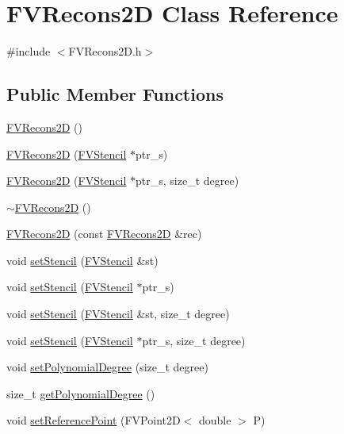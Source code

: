 \hypertarget{classFVRecons2D}{
\section{FVRecons2D Class Reference}
\label{d3/dde/classFVRecons2D}
}


{\ttfamily \#include $<$FVRecons2D.h$>$}

\subsection*{Public Member Functions}
\begin{DoxyCompactItemize}
\item 
\hyperlink{classFVRecons2D_a8dcae930edb192e8d7746e6031eb0867}{FVRecons2D} ()
\item 
\hyperlink{classFVRecons2D_ae47016c5a6bf585400dc3c8bb3cac92f}{FVRecons2D} (\hyperlink{classFVStencil}{FVStencil} $\ast$ptr\_\-s)
\item 
\hyperlink{classFVRecons2D_a22338ce4847ebe33f1e9df7812ef2ff6}{FVRecons2D} (\hyperlink{classFVStencil}{FVStencil} $\ast$ptr\_\-s, size\_\-t degree)
\item 
\hyperlink{classFVRecons2D_afb0d79b083085e220cd997f303bd3167}{$\sim$FVRecons2D} ()
\item 
\hyperlink{classFVRecons2D_a82e142c7d6224286ced86967aa11b349}{FVRecons2D} (const \hyperlink{classFVRecons2D}{FVRecons2D} \&rec)
\item 
void \hyperlink{classFVRecons2D_a34d8474a5f5470cab6f077871c7387da}{setStencil} (\hyperlink{classFVStencil}{FVStencil} \&st)
\item 
void \hyperlink{classFVRecons2D_a9fd35e2a4d7096ce3fec84bfc30bf095}{setStencil} (\hyperlink{classFVStencil}{FVStencil} $\ast$ptr\_\-s)
\item 
void \hyperlink{classFVRecons2D_a82cbc1bab2638e760ea3ca50bd393ba6}{setStencil} (\hyperlink{classFVStencil}{FVStencil} \&st, size\_\-t degree)
\item 
void \hyperlink{classFVRecons2D_a6d820346769771af609dbdaa7b1f3021}{setStencil} (\hyperlink{classFVStencil}{FVStencil} $\ast$ptr\_\-s, size\_\-t degree)
\item 
void \hyperlink{classFVRecons2D_a277a64063b5e54974f88aa36f01dd729}{setPolynomialDegree} (size\_\-t degree)
\item 
size\_\-t \hyperlink{classFVRecons2D_a51ced9e32566282ad2c8aa54e23f3cc5}{getPolynomialDegree} ()
\item 
void \hyperlink{classFVRecons2D_adefd5b78a5f9730ed90fa03fe7ddb671}{setReferencePoint} (FVPoint2D$<$ double $>$ P)

\end{DoxyCompactItemize}
